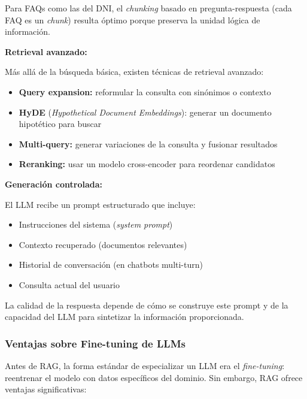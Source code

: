 Para FAQs como las del DNI, el \textit{chunking} basado en pregunta-respuesta (cada FAQ es un \textit{chunk}) resulta \'optimo porque preserva la unidad l\'ogica de informaci\'on.

\textbf{Retrieval avanzado:}

M\'as all\'a de la b\'usqueda b\'asica, existen t\'ecnicas de retrieval avanzado:
\begin{itemize}
    \item \textbf{Query expansion:} reformular la consulta con sin\'onimos o contexto
    \item \textbf{HyDE} (\textit{Hypothetical Document Embeddings}): generar un documento hipot\'etico para buscar
    \item \textbf{Multi-query:} generar variaciones de la consulta y fusionar resultados
    \item \textbf{Reranking:} usar un modelo cross-encoder para reordenar candidatos
\end{itemize}

\textbf{Generaci\'on controlada:}

El LLM recibe un prompt estructurado que incluye:
\begin{itemize}
    \item Instrucciones del sistema (\textit{system prompt})
    \item Contexto recuperado (documentos relevantes)
    \item Historial de conversaci\'on (en chatbots multi-turn)
    \item Consulta actual del usuario
\end{itemize}

La calidad de la respuesta depende de c\'omo se construye este prompt y de la capacidad del LLM para sintetizar la informaci\'on proporcionada.

\subsubsection{Ventajas sobre Fine-tuning de LLMs}
\label{subsubsec:rag-vs-finetuning}

Antes de RAG, la forma est\'andar de especializar un LLM era el \textit{fine-tuning}: reentrenar el modelo con datos espec\'ificos del dominio. Sin embargo, RAG ofrece ventajas significativas:

